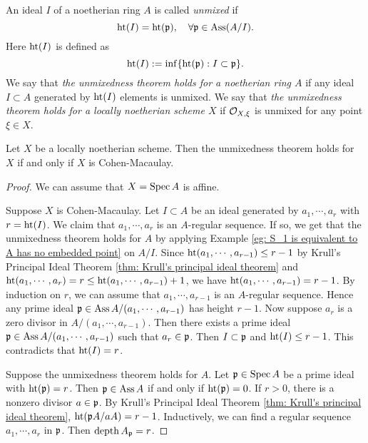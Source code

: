     \begin{definition}\label{def: unmixedness theorem}
        An ideal $I$ of a noetherian ring $A$ is called \textit{unmixed} if 
        \[ \operatorname{ht}(I) = \operatorname{ht}({\mathfrak{p}}), \quad \forall {\mathfrak{p}} \in \operatorname{Ass}(A/I). \]
        Here $\operatorname{ht}(I)$ is defined as 
        \[ \operatorname{ht}(I) := \inf \{ \operatorname{ht}({\mathfrak{p}}) : I \subset {\mathfrak{p}} \}. \]
        We say that \textit{the unmixedness theorem holds for a noetherian ring $A$} if any ideal $I \subset A$ generated by $\operatorname{ht}(I)$ elements is unmixed.
        We say that \textit{the unmixedness theorem holds for a locally noetherian scheme $X$} if ${\mathcal{O}}_{X,\xi}$ is unmixed for any point $\xi \in X$.
    \end{definition}


    \begin{theorem}\label{thm: unmixedness theorem for Cohen-Macaulay schemes}
        Let $X$ be a locally noetherian scheme.
        Then the unmixedness theorem holds for $X$ if and only if $X$ is Cohen-Macaulay.
    \end{theorem}
    \begin{proof}
        We can assume that $X = \operatorname{Spec} A$ is affine.

        Suppose $X$ is Cohen-Macaulay.
        Let $I \subset A$ be an ideal generated by $a_1,\cdots,a_r$ with $r = \operatorname{ht}(I)$.
        We claim that $a_1,\cdots,a_r$ is an $A$-regular sequence.
        If so, we get that the unmixedness theorem holds for $A$ by applying Example \ref{eg: S_1 is equivalent to A has no embedded point} on $A/I$. 
        Since $\operatorname{ht}(a_1,\cdots,a_{r-1}) \leq r-1$ by Krull's Principal Ideal Theorem \ref{thm: Krull's principal ideal theorem} and $\operatorname{ht}(a_1,\cdots,a_r) = r \leq \operatorname{ht}(a_1,\cdots,a_{r-1}) + 1$, we have $\operatorname{ht}(a_1,\cdots,a_{r-1}) = r-1$.
        By induction on $r$, we can assume that $a_1,\cdots,a_{r-1}$ is an $A$-regular sequence.
        Hence any prime ideal ${\mathfrak{p}} \in \operatorname{Ass} A/(a_1,\cdots,a_{r-1})$ has height $r-1$.
        Now suppose $a_r$ is a zero divisor in $A/(a_1,\cdots,a_{r-1})$.
        Then there exists a prime ideal ${\mathfrak{p}} \in \operatorname{Ass} A/(a_1,\cdots,a_{r-1})$ such that $a_r \in {\mathfrak{p}}$.
        Then $I \subset {\mathfrak{p}}$ and $\operatorname{ht}(I) \leq r-1$.
        This contradicts that $\operatorname{ht}(I) = r$.
        
        Suppose the unmixedness theorem holds for $A$.
        Let ${\mathfrak{p}} \in \operatorname{Spec} A$ be a prime ideal with $\operatorname{ht}({\mathfrak{p}}) = r$.
        Then ${\mathfrak{p}} \in \operatorname{Ass} A$ if and only if $\operatorname{ht}({\mathfrak{p}}) = 0$.
        If $r > 0$, there is a nonzero divisor $a \in {\mathfrak{p}}$.
        By Krull's Principal Ideal Theorem \ref{thm: Krull's principal ideal theorem}, $\operatorname{ht}({\mathfrak{p}} A/aA) = r-1$.
        Inductively, we can find a regular sequence $a_1,\cdots,a_r$ in ${\mathfrak{p}}$.
        Then $\operatorname{depth} A_{\mathfrak{p}} = r$.
    \end{proof}

